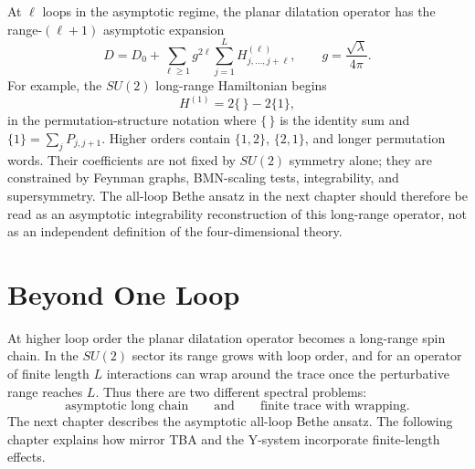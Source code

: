 At \(\ell\) loops in the asymptotic regime, the planar dilatation operator has
the range-\((\ell+1)\) asymptotic expansion
\[
  D
  =
  D_0+\sum_{\ell\geq1}g^{2\ell}
  \sum_{j=1}^{L}
  H^{(\ell)}_{j,\ldots,j+\ell},
  \qquad g=\frac{\sqrt\lambda}{4\pi}.
\]
For example, the \(SU(2)\) long-range Hamiltonian begins
\[
  H^{(1)}=2\{\,\}-2\{1\},
\]
in the permutation-structure notation where \(\{\,\}\) is the identity sum and
\(\{1\}=\sum_jP_{j,j+1}\).  Higher orders contain \(\{1,2\}\),
\(\{2,1\}\), and longer permutation words.  Their coefficients are not fixed
by \(SU(2)\) symmetry alone; they are constrained by Feynman graphs,
BMN-scaling tests, integrability, and supersymmetry.  The all-loop Bethe
ansatz in the next chapter should therefore be read as an asymptotic
integrability reconstruction of this long-range operator, not as an
independent definition of the four-dimensional theory.

\section{Beyond One Loop}

At higher loop order the planar dilatation operator becomes a long-range spin
chain.  In the \(SU(2)\) sector its range grows with loop order, and for an
operator of finite length \(L\) interactions can wrap around the trace once
the perturbative range reaches \(L\).  Thus there are two different spectral
problems:
\[
  \text{asymptotic long chain}
  \qquad\text{and}\qquad
  \text{finite trace with wrapping}.
\]
The next chapter describes the asymptotic all-loop Bethe ansatz.  The
following chapter explains how mirror TBA and the Y-system incorporate
finite-length effects.
